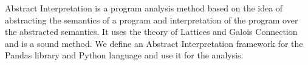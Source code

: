 \large
Abstract Interpretation is a program analysis method based on the idea
of abstracting the semantics of a program and interpretation of the
program over the abstracted semantics.
It uses the theory of Lattices and Galois Connection and is a sound method.
We define an Abstract Interpretation framework for the Pandas library and Python language and use it for the analysis.